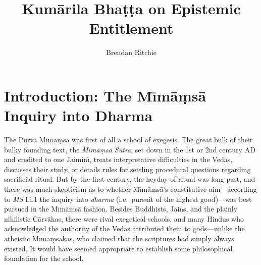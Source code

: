 ﻿\documentclass[11pt]{amsart}
\author{Brendan Ritchie}
\title{Kum\=arila Bha\d t\d ta on Epistemic Entitlement}
\begin{document}
\maketitle

\thispagestyle{empty}


















\section{Introduction: The M\={\i}m\=a\d ms\=a Inquiry into Dharma}

The P\=urva M\={\i}m\=a\d ms\=a was first of all a school of exegesis. The great bulk of their bulky founding text, the \emph{M\={\i}m\=a\d ms\=a S\=utra}, set down in the 1st or 2nd century AD and credited to one Jaimin\={\i}, treats interpretative difficulties in the Vedas, discusses their study, or details rules for settling procedural questions regarding sacrificial ritual. But by the first century, the heyday of ritual was long past, and there was much skepticism as to whether M\={\i}m\=a\d ms\=a's constitutive aim---according to \emph{MS} I.i.1 the inquiry into \emph{dharma} (i.e.~pursuit of the highest good)---was best pursued in the M\={\i}m\=a\d ms\=a fashion. Besides Buddhists, Jains, and the plainly nihilistic C\=arv\=akas, there were rival exegetical schools, and many Hindus who acknowledged the authority of the Vedas attributed them to gods---unlike the atheistic M\={\i}m\=a\d ms\=akas, who claimed that the scriptures had simply always existed. It would have seemed appropriate to establish some philosophical foundation for the school.
\end{document}
